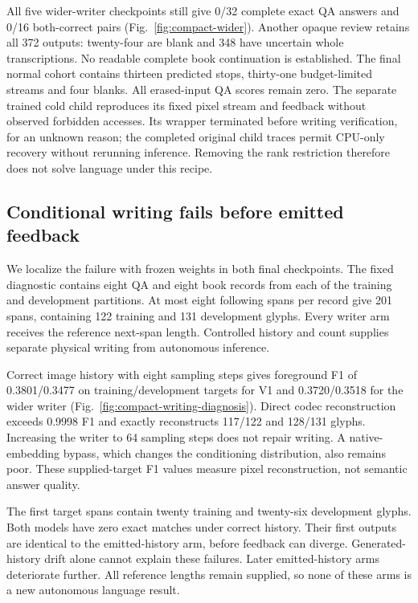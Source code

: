 All five wider-writer checkpoints still give 0/32 complete exact QA answers
and 0/16 both-correct pairs (Fig.~\ref{fig:compact-wider}). Another opaque
review retains all 372 outputs: twenty-four are blank and 348 have uncertain
whole transcriptions. No readable complete book continuation is established.
The final normal cohort contains thirteen predicted stops, thirty-one
budget-limited streams and four blanks. All erased-input QA scores remain
zero. The separate trained cold child reproduces its fixed pixel stream and
feedback without observed forbidden accesses. Its wrapper terminated before
writing verification, for an unknown reason; the completed original child
traces permit CPU-only recovery without rerunning inference. Removing the
rank restriction therefore does not solve language under this recipe.

\subsection*{Conditional writing fails before emitted feedback}
We localize the failure with frozen weights in both final checkpoints.
The fixed diagnostic contains eight QA and eight book records from each of
the training and development partitions. At most eight following spans per
record give 201 spans, containing 122 training and 131 development glyphs.
Every writer arm receives the reference next-span length. Controlled history
and count supplies separate physical writing from autonomous inference.

Correct image history with eight sampling steps gives foreground F1 of
0.3801/0.3477 on training/development targets for V1 and 0.3720/0.3518 for
the wider writer (Fig.~\ref{fig:compact-writing-diagnosis}). Direct codec
reconstruction exceeds 0.9998 F1 and exactly reconstructs 117/122 and
128/131 glyphs. Increasing the writer to 64 sampling steps does not repair
writing. A native-embedding bypass, which changes the conditioning
distribution, also remains poor. These supplied-target F1 values measure
pixel reconstruction, not semantic answer quality.

The first target spans contain twenty training and twenty-six development
glyphs. Both models have zero exact matches under correct history. Their
first outputs are identical to the emitted-history arm, before feedback can
diverge. Generated-history drift alone cannot explain these failures.
Later emitted-history arms deteriorate further. All reference lengths remain
supplied, so none of these arms is a new autonomous language result.

